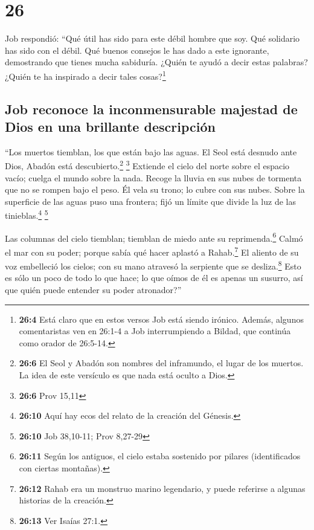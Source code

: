\hypertarget{section-25}{%
\section{26}\label{section-25}}

 Job respondió:  ``Qué útil has sido para
este débil hombre que soy. Qué solidario has sido con el débil.
 Qué buenos consejos le has dado a este ignorante,
demostrando que tienes mucha sabiduría.  ¿Quién te ayudó a
decir estas palabras? ¿Quién te ha inspirado a decir tales
cosas?\footnote{\textbf{26:4} Está claro que en estos versos Job está
  siendo irónico. Además, algunos comentaristas ven en 26:1-4 a Job
  interrumpiendo a Bildad, que continúa como orador de 26:5-14.}

\hypertarget{job-reconoce-la-inconmensurable-majestad-de-dios-en-una-brillante-descripciuxf3n}{%
\subsection{Job reconoce la inconmensurable majestad de Dios en una
brillante
descripción}\label{job-reconoce-la-inconmensurable-majestad-de-dios-en-una-brillante-descripciuxf3n}}

 ``Los muertos tiemblan, los que están bajo las aguas.
 El Seol está desnudo ante Dios, Abadón está
descubierto.\footnote{\textbf{26:6} El Seol y Abadón son nombres del
  inframundo, el lugar de los muertos. La idea de este versículo es que
  nada está oculto a Dios.} \footnote{\textbf{26:6} Prov 15,11}
 Extiende el cielo del norte sobre el espacio vacío;
cuelga el mundo sobre la nada.  Recoge la lluvia en sus
nubes de tormenta que no se rompen bajo el peso.  Él vela
su trono; lo cubre con sus nubes.  Sobre la superficie de
las aguas puso una frontera; fijó un límite que divide la luz de las
tinieblas.\footnote{\textbf{26:10} Aquí hay ecos del relato de la
  creación del Génesis.} \footnote{\textbf{26:10} Job 38,10-11; Prov
  8,27-29}

 Las columnas del cielo tiemblan; tiemblan de miedo ante
su reprimenda.\footnote{\textbf{26:11} Según los antiguos, el cielo
  estaba sostenido por pilares (identificados con ciertas montañas).}
 Calmó el mar con su poder; porque sabía qué hacer
aplastó a Rahab.\footnote{\textbf{26:12} Rahab era un monstruo marino
  legendario, y puede referirse a algunas historias de la creación.}
 El aliento de su voz embelleció los cielos; con su mano
atravesó la serpiente que se desliza.\footnote{\textbf{26:13} Ver Isaías
  27:1.}  Esto es sólo un poco de todo lo que hace; lo
que oímos de él es apenas un susurro, así que quién puede entender su
poder atronador?''

